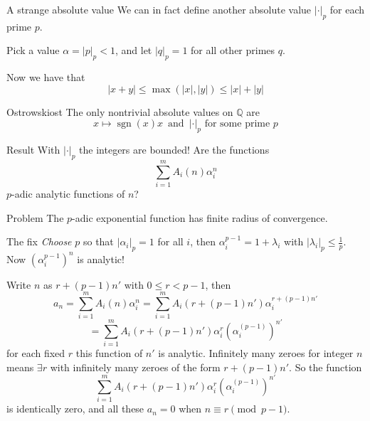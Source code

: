 \documentclass[notheorems]{beamer}
\theoremstyle{plain}
\DeclareMathOperator{\sgn}{sgn}
\newcommand{\QQ}{\mathbb Q}
\newcommand{\lt}{<}
\begin{document}
\begin{frame}{A strange absolute value}
    We can in fact define another absolute value $|\cdot |_p$ for each prime $p$.

    Pick a value $\alpha = |p|_p < 1$, and let $|q|_p=1$ for all other primes $q$.

    Now we have that \[|x+y| \le \max(|x|, |y|) \le |x| + |y|\]


    \begin{theorem}{Ostrowski}{ost}\label{theorem-36}
        The only nontrivial absolute values on \(\QQ\) are%
        \begin{equation*}
            x \mapsto \sgn(x) x\, \text{ and }\, |\cdot|_p \text{ for some prime $p$}
        \end{equation*}
    \end{theorem}
\end{frame}

\begin{frame}{Result}
    With \(|\cdot|_p\) the integers are bounded!
    \pause
    Are the functions%
    \begin{equation*}
        \sum_{i=1}^m A_i(n)\alpha_i^n
    \end{equation*}
    \(p\)-adic analytic functions of \(n\)?%
    \par
    \pause
    \begin{alertblock}{Problem}
        The \(p\)-adic exponential function has finite radius of convergence.
    \end{alertblock}
    \pause
    \begin{exampleblock}{The fix}
        \emph{Choose} \(p\) so that \(|\alpha_i|_p = 1\) for all \(i\), then \(\alpha_i^{p-1} = 1 + \lambda_i\) with \(|\lambda_i|_p \le \frac 1p\).
        Now \((\alpha_i^{p-1})^n\) is analytic!%
    \end{exampleblock}
\end{frame}

\begin{frame}
    Write \(n\) as \(r + (p-1)n'\) with \(0\le r \lt p-1\)\pause, then
    \begin{equation*}
        a_n = \sum_{i=1}^m A_i(n)\alpha_i^n = \sum_{i=1}^m A_i(r + (p-1)n')\alpha_i^{r + (p-1)n'}
    \end{equation*}
    \begin{equation*}
        = \sum_{i=1}^m A_i(r + (p-1)n')\alpha_i^{r} (\alpha_i^{(p-1)})^{n'}
    \end{equation*}
    for each fixed \(r\) this function of \(n'\) is analytic.
    \pause Infinitely many zeroes for integer \(n\) means \(\exists r\) with infinitely many zeroes of the form \(r + (p-1)n'\). So the function%
    \begin{equation*}
        \sum_{i=1}^m A_i(r + (p-1)n')\alpha_i^{r} (\alpha_i^{(p-1)})^{n'}
    \end{equation*}
    is identically zero, and all these \(a_n = 0\) when \(n \equiv r \pmod{p-1}\).%
    \par
\end{frame}
\end{document}
